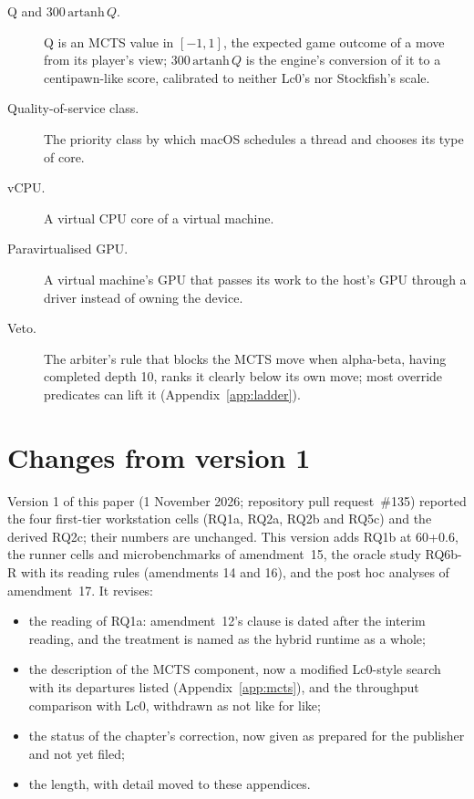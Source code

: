\documentclass{article}
\begin{document}
\begin{description}
  \item[Q and $300\,\mathrm{artanh}\,Q$.] Q is an MCTS value in $[-1, 1]$, the expected game outcome of a move from its player's view; $300\,\mathrm{artanh}\,Q$ is the engine's conversion of it to a centipawn-like score, calibrated to neither Lc0's nor Stockfish's scale.
  \item[Quality-of-service class.] The priority class by which macOS schedules a thread and chooses its type of core.
  \item[vCPU.] A virtual CPU core of a virtual machine.
  \item[Paravirtualised GPU.] A virtual machine's GPU that passes its work to the host's GPU through a driver instead of owning the device.
  \item[Veto.] The arbiter's rule that blocks the MCTS move when alpha-beta, having completed depth 10, ranks it clearly below its own move; most override predicates can lift it (Appendix~\ref{app:ladder}).
\end{description}

\section{Changes from version 1}
\label{app:changes}
Version 1 of this paper (1 November 2026; repository pull request~\#135) reported the four first-tier workstation cells (RQ1a, RQ2a, RQ2b and RQ5c) and the derived RQ2c; their numbers are unchanged. This version adds RQ1b at 60+0.6, the runner cells and microbenchmarks of amendment~15, the oracle study RQ6b-R with its reading rules (amendments 14 and 16), and the post hoc analyses of amendment~17. It revises:
\begin{itemize}
  \item the reading of RQ1a: amendment~12's clause is dated after the interim reading, and the treatment is named as the hybrid runtime as a whole;
  \item the description of the MCTS component, now a modified Lc0-style search with its departures listed (Appendix~\ref{app:mcts}), and the throughput comparison with Lc0, withdrawn as not like for like;
  \item the status of the chapter's correction, now given as prepared for the publisher and not yet filed;
  \item the length, with detail moved to these appendices.
\end{itemize}
\end{document}
